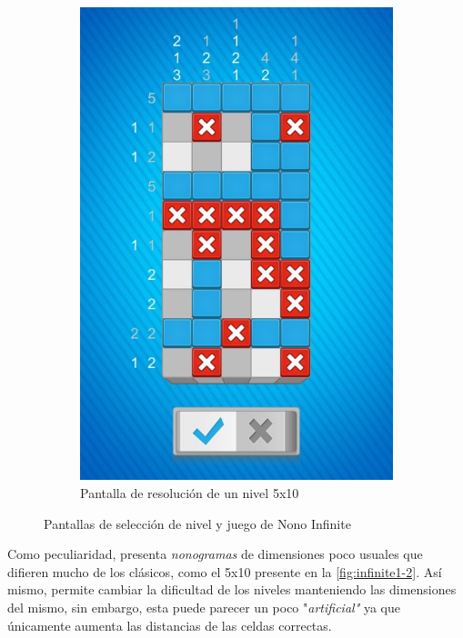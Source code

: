\begin{figure}[h!]
\begin{subfigure}[b]{0.49\linewidth}
     \includegraphics[width=\linewidth]{images/infinite2.png}
     \caption{Pantalla de resolución de un nivel 5x10}
     \label{fig:infinite1-2}
   \end{subfigure}
   \caption{Pantallas de selección de nivel y juego de Nono Infinite}
   \label{fig:infinite1}
 \end{figure}

Como peculiaridad, presenta \textit{nonogramas} de dimensiones poco usuales que difieren mucho de los clásicos, como el 5x10 presente en la
\autoref{fig:infinite1-2}. Así mismo, permite cambiar la dificultad de los niveles manteniendo las dimensiones del mismo, sin embargo,
esta puede parecer un poco "\textit{artificial"} ya que únicamente aumenta las distancias de las celdas correctas.

